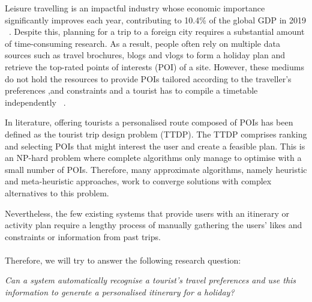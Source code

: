 
Leisure travelling is an impactful industry
whose economic importance significantly improves each
year, contributing to 10.4\% of the global GDP in 2019
~\cite{wttc2018travel}. Despite this, planning for a trip to a
foreign city requires a substantial amount of
time-consuming research. As a result, people often
rely on multiple data sources such as travel
brochures, blogs and vlogs to form a holiday plan and
retrieve the top-rated points of interests (POI) of a site. 
However,  these mediums do not hold the
resources to provide POIs tailored according to the traveller's preferences ,and
constraints and a tourist has to compile a timetable
independently
~\cite{DeChoudhury2010}. 

In literature, offering tourists a personalised route
composed of POIs has been defined as the tourist trip
design problem (TTDP). The TTDP comprises ranking
and selecting POIs that might interest the user and
create a feasible plan. 
This is an NP-hard problem where complete 
algorithms only manage to optimise with a small number
of POIs. Therefore, many approximate algorithms,
namely heuristic and meta-heuristic approaches, work
to converge solutions with complex alternatives to
this problem.

Nevertheless, the few existing systems that provide
users with an itinerary or activity plan require a lengthy
process of manually gathering the users' likes and
constraints or information from past trips. 
\\
\\

\noindent Therefore, 
we will try to answer the following research question:


\begin{center}

\textit{Can a system automatically recognise a tourist's travel
preferences and use this information to generate a personalised itinerary
for a holiday?}

\end{center}


